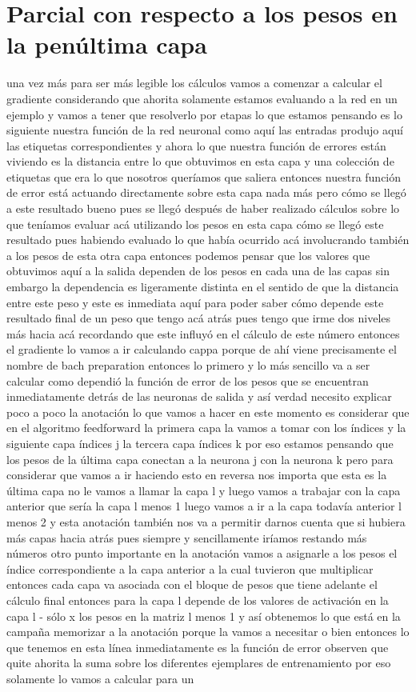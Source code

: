 \section{Parcial con respecto a los pesos en la penúltima capa}

una vez más para ser más legible los cálculos vamos a comenzar a calcular el gradiente considerando que ahorita solamente estamos evaluando a la red en un ejemplo y vamos a tener que resolverlo por etapas lo que estamos pensando es lo siguiente nuestra función de la red neuronal como aquí las entradas produjo aquí las etiquetas correspondientes y ahora lo que nuestra función de errores están viviendo es la distancia entre lo que obtuvimos en esta capa y una colección de etiquetas que era lo que nosotros queríamos que saliera entonces nuestra función de error está actuando directamente sobre esta capa nada más pero cómo se llegó a este resultado bueno pues se llegó después de haber realizado cálculos sobre lo que teníamos evaluar acá utilizando los pesos en esta capa cómo se llegó este resultado pues habiendo evaluado lo que había ocurrido acá involucrando también a los pesos de esta otra capa entonces podemos pensar que los valores que obtuvimos aquí a la salida dependen de los pesos en cada una de las capas sin embargo la dependencia es ligeramente distinta en el sentido de que la distancia entre este peso y este es inmediata aquí para poder saber cómo depende este resultado final de un peso que tengo acá atrás pues tengo que irme dos niveles más hacia acá recordando que este influyó en el cálculo de este número entonces el gradiente lo vamos a ir calculando cappa porque de ahí viene precisamente el nombre de bach preparation entonces lo primero y lo más sencillo va a ser calcular como dependió la función de error de los pesos que se encuentran inmediatamente detrás de las neuronas de salida y así verdad necesito explicar poco a poco la anotación lo que vamos a hacer en este momento es considerar que en el algoritmo feedforward la primera capa la vamos a tomar con los índices y la siguiente capa índices j la tercera capa índices k por eso estamos pensando que los pesos de la última capa conectan a la neurona j con la neurona k pero para considerar que vamos a ir haciendo esto en reversa nos importa que esta es la última capa no le vamos a llamar la capa l y luego vamos a trabajar con la capa anterior que sería la capa l menos 1 luego vamos a ir a la capa todavía anterior l menos 2 y esta anotación también nos va a permitir darnos cuenta que si hubiera más capas hacia atrás pues siempre y sencillamente iríamos restando más números otro punto importante en la anotación vamos a asignarle a los pesos el índice correspondiente a la capa anterior a la cual tuvieron que multiplicar entonces cada capa va asociada con el bloque de pesos que tiene adelante el cálculo final entonces para la capa l depende de los valores de activación en la capa l - sólo x los pesos en la matriz l menos 1 y así obtenemos lo que está en la campaña memorizar a la anotación porque la vamos a necesitar o bien entonces lo que tenemos en esta línea inmediatamente es la función de error observen que quite ahorita la suma sobre los diferentes ejemplares de entrenamiento por eso solamente lo vamos a calcular para un 